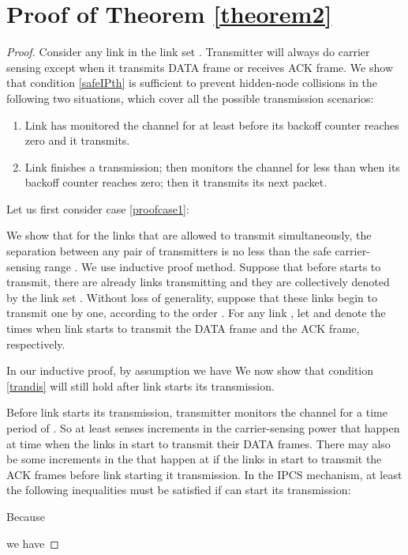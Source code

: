 \documentclass[conference]{IEEEtran}
\begin{document}
\section{Proof of Theorem \ref{theorem2}}\label{theorem2proof}
\begin{proof}
Consider any link  in the link set . Transmitter
 will always do carrier sensing except when it transmits DATA
frame or receives ACK frame. We show that condition \eqref{safeIPth}
is suff\/icient to prevent hidden-node collisions in the following
two situations, which cover all the possible transmission scenarios:
\begin{enumerate}
\item{Link  has monitored the channel for at least 
before its backoff counter reaches zero and it
transmits.}\label{proofcase1}
\item{Link  f\/inishes a transmission; then monitors the channel
for less than  when its backoff counter reaches zero;
then it transmits its next packet.}\label{proofcase2}
\end{enumerate}

Let us f\/irst consider case \ref{proofcase1}:

We show that for the links that are allowed to transmit
simultaneously, the separation between any pair of transmitters is
no less than the safe carrier-sensing range
. We use inductive
proof method. Suppose that before  starts to transmit, there
are already  links transmitting and they are collectively denoted
by the link set . Without loss of generality,
suppose that these  links begin to transmit one by one, according
to the order . For any link , let  and  denote the times when link  starts
to transmit the DATA frame and the ACK frame, respectively.

In our inductive proof, by assumption we have 
We now show that condition \eqref{trandis} will still hold after
link  starts its transmission.

Before link  starts its transmission, transmitter 
monitors the channel for a time period of . So  at
least senses  increments in the carrier-sensing power
 that happen at time  when the
links in  start to transmit their DATA frames.
There may also be some increments in the  that happen
at  if the links in  start
to transmit the ACK frames before link  starting it
transmission. In the IPCS mechanism, at least the following 
inequalities must be satisf\/ied if  can start its
transmission:

Because

we have


\end{proof}
\end{document}
